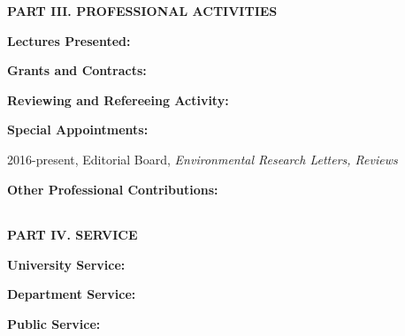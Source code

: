 \documentclass[10pt]{article}
\begin{document}
\vspace{0.5cm}
\textbf{PART III.  PROFESSIONAL ACTIVITIES}

\vspace{0.5cm}
\textbf{Lectures Presented:}
\vspace{0.25cm}
{\setlength{\extrarowheight}{3.5pt}

}

\vspace{0.5cm}
\textbf{Grants and Contracts:}
\vspace{0.25cm}
{\setlength{\extrarowheight}{3.5pt}

}

\vspace{0.5cm}
\textbf{Reviewing and Refereeing Activity:}
\vspace{0.2cm}


\vspace{0.25cm}
\textbf{Special Appointments:}

\hspace{0.5cm} 2016-present, Editorial Board, \textit{Environmental Research Letters, Reviews}

\vspace{0.25cm}
\textbf{Other Professional Contributions:}
\hspace{0.5cm}
\begin{tabular}{lp{2cm}p{12cm}}
\end{tabular}


\vspace{0.5cm}
\textbf{PART IV.  SERVICE}

\vspace{0.25cm}
\textbf{University Service:}
\vspace{0.2cm}


\vspace{0.5cm}
\textbf{Department Service:}
\vspace{0.2cm}


\vspace{0.5cm}
\textbf{Public Service:}
\vspace{0.2cm}

\end{document}
